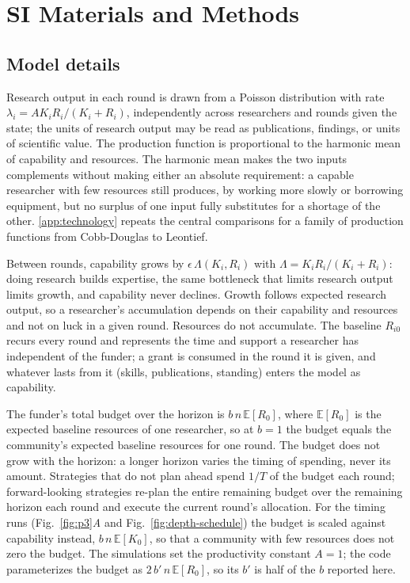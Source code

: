 \makeatletter
\section*{SI Materials and Methods}
\label{app:simulation}\label{sec:model}
\makeatother

\subsection*{Model details}
Research output in each round is drawn from a Poisson distribution with rate $\lambda_i = AK_iR_i/(K_i + R_i)$, independently across researchers and rounds given the state; the units of research output may be read as publications, findings, or units of scientific value. The production function is proportional to the harmonic mean of capability and resources. The harmonic mean makes the two inputs complements without making either an absolute requirement: a capable researcher with few resources still produces, by working more slowly or borrowing equipment, but no surplus of one input fully substitutes for a shortage of the other. \ref{app:technology} repeats the central comparisons for a family of production functions from Cobb-Douglas to Leontief.

Between rounds, capability grows by $\epsilon\,\Lambda(K_i, R_i)$ with $\Lambda = K_iR_i/(K_i + R_i)$: doing research builds expertise, the same bottleneck that limits research output limits growth, and capability never declines. Growth follows expected research output, so a researcher's accumulation depends on their capability and resources and not on luck in a given round. Resources do not accumulate. The baseline $R_{i0}$ recurs every round and represents the time and support a researcher has independent of the funder; a grant is consumed in the round it is given, and whatever lasts from it (skills, publications, standing) enters the model as capability.

The funder's total budget over the horizon is $b\,n\,\mathbb{E}[R_0]$, where $\mathbb{E}[R_0]$ is the expected baseline resources of one researcher, so at $b = 1$ the budget equals the community's expected baseline resources for one round. The budget does not grow with the horizon: a longer horizon varies the timing of spending, never its amount. Strategies that do not plan ahead spend $1/T$ of the budget each round; forward-looking strategies re-plan the entire remaining budget over the remaining horizon each round and execute the current round's allocation. For the timing runs (Fig.~\ref{fig:p3}\textit{A} and Fig.~\ref{fig:depth-schedule}) the budget is scaled against capability instead, $b\,n\,\mathbb{E}[K_0]$, so that a community with few resources does not zero the budget. The simulations set the productivity constant $A = 1$; the code parameterizes the budget as $2\,b'\,n\,\mathbb{E}[R_0]$, so its $b'$ is half of the $b$ reported here.

